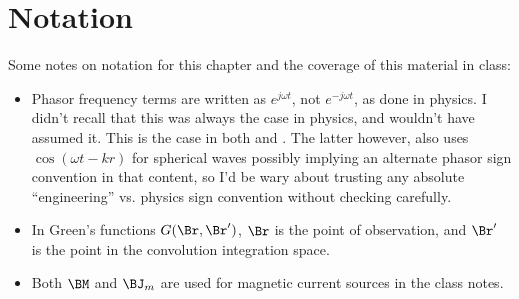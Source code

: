 %
%
\section{Notation}
%
Some notes on notation for this chapter and the coverage of this material in class:
%
\begin{itemize}
\item Phasor frequency terms are written as \( e^{j \omega t} \), not \( e^{-j \omega t} \), as done in physics.  I didn't recall that this was always the case in physics, and wouldn't have assumed it.  This is the case in both \citep{jackson1975cew:simpleRadiating} and \citep{griffiths1999introduction:waves}.  The latter however, also uses \( \cos(\omega t - k r) \) for spherical waves possibly implying an alternate phasor sign convention in that content, so I'd be wary about trusting any absolute ``engineering'' vs. physics sign convention without checking carefully.
\item In Green's functions \( G(\Br, \Br') \), \( \Br \) is the point of observation, and \( \Br' \) is the point in the convolution integration space.
\item Both \( \BM \) and \( \BJ_m \) are used for magnetic current sources in the class notes.
\end{itemize}
